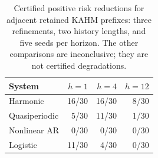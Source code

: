 \begin{table}[t]
\centering\small
\begin{tabular}{lrrr}
\toprule
System & $h=1$ & $h=4$ & $h=12$\\
\midrule
Harmonic & 16/30 & 16/30 & 8/30\\
Quasiperiodic & 5/30 & 11/30 & 1/30\\
Nonlinear AR & 0/30 & 0/30 & 0/30\\
Logistic & 11/30 & 4/30 & 0/30\\
\bottomrule
\end{tabular}
\caption{Certified positive risk reductions for adjacent retained KAHM prefixes: three refinements, two history lengths, and five seeds per horizon. The other comparisons are inconclusive; they are not certified degradations.}
\label{tab:improvements}
\end{table}
